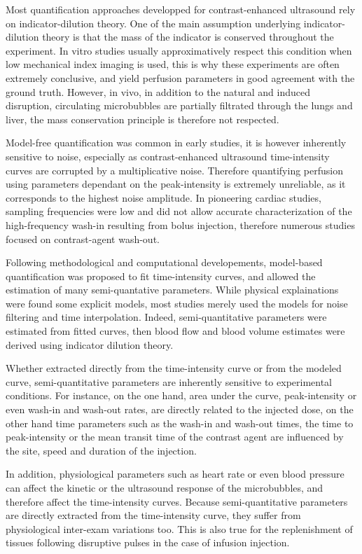 Most quantification approaches developped for contrast-enhanced ultrasound rely on indicator-dilution theory.
One of the main assumption underlying indicator-dilution theory is that the mass of the indicator is conserved throughout the experiment.
In vitro studies usually approximatively respect this condition when low mechanical index imaging is used, this is why these experiments are often extremely conclusive, and yield perfusion parameters in good agreement with the ground truth. 
However, in vivo, in addition to the natural and induced disruption, circulating microbubbles are partially filtrated through the lungs and liver, the mass conservation principle is therefore not respected.

Model-free quantification was common in early studies, it is however inherently sensitive to noise, especially as contrast-enhanced ultrasound time-intensity curves are corrupted by a multiplicative noise.
Therefore quantifying perfusion using parameters dependant on the peak-intensity is extremely unreliable, as it corresponds to the highest noise amplitude.
In pioneering cardiac studies, sampling frequencies were low and did not allow accurate characterization of the high-frequency wash-in resulting from bolus injection, therefore numerous studies focused on contrast-agent wash-out.

Following methodological and computational developements, model-based quantification was proposed to fit time-intensity curves, and allowed the estimation of many semi-quantative parameters. 
While physical explainations were found some explicit models, most studies merely used the models for noise filtering and time interpolation.
Indeed, semi-quantitative parameters were estimated from fitted curves, then blood flow and blood volume estimates were derived using indicator dilution theory.

Whether extracted directly from the time-intensity curve or from the modeled curve, semi-quantitative parameters are inherently sensitive to experimental conditions.
For instance, on the one hand, area under the curve, peak-intensity or even wash-in and wash-out rates, are directly related to the injected dose, on the other hand time parameters such as the wash-in and wash-out times, the time to peak-intensity or the mean transit time of the contrast agent are influenced by the site, speed and duration of the injection.

In addition, physiological parameters such as heart rate or even blood pressure can affect the kinetic or the ultrasound response of the microbubbles, and therefore affect the time-intensity curves. 
Because semi-quantitative parameters are directly extracted from the time-intensity curve, they suffer from physiological inter-exam variations too. 
This is also true for the replenishment of tissues following disruptive pulses in the case of infusion injection.

